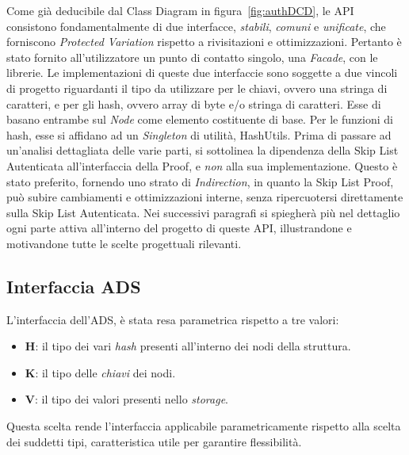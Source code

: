	Come già deducibile dal Class Diagram in figura~\ref{fig:authDCD}, le API consistono fondamentalmente di due interfacce, \textit{stabili}, \textit{comuni} e \textit{unificate}, che forniscono \textit{Protected Variation} rispetto a rivisitazioni e ottimizzazioni. Pertanto è stato fornito all'utilizzatore un punto di contatto singolo, una \textit{Facade}, con le librerie. 
	Le implementazioni di queste due interfaccie sono soggette a due vincoli di progetto riguardanti il tipo da utilizzare per le chiavi, ovvero una stringa di caratteri, e per gli hash, ovvero array di byte e/o stringa di caratteri. Esse di basano entrambe sul \textit{Node} come elemento costituente di base. Per le funzioni di hash, esse si affidano ad un \textit{Singleton} di utilità, HashUtils. Prima di passare ad un'analisi dettagliata delle varie parti, si sottolinea la dipendenza della Skip List Autenticata all'interfaccia della Proof, e \textit{non} alla sua implementazione. Questo è stato preferito, fornendo uno strato di \textit{Indirection}, in quanto la Skip List Proof, può subire cambiamenti e ottimizzazioni interne, senza ripercuotersi direttamente sulla Skip List Autenticata.
	Nei successivi paragrafi si spiegherà più nel dettaglio ogni parte attiva all'interno del progetto di queste API, illustrandone e motivandone tutte le scelte progettuali rilevanti.
	
	\subsection{Interfaccia ADS}
	
	
		L'interfaccia dell'ADS, è stata resa parametrica rispetto a tre valori:
		
		\begin{itemize}
			\item \textbf{H}: il tipo dei vari \textit{hash} presenti all'interno dei nodi della struttura.
			\item \textbf{K}: il tipo delle \textit{chiavi} dei nodi.
			\item \textbf{V}: il tipo dei valori presenti nello \textit{storage}. 
		\end{itemize}
	
		Questa scelta rende l'interfaccia applicabile parametricamente rispetto alla scelta dei suddetti tipi, caratteristica utile per garantire flessibilità. 

